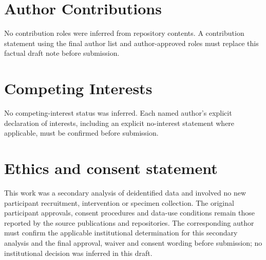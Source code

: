\section*{Author Contributions}

No contribution roles were inferred from repository contents. A contribution statement
using the final author list and author-approved roles must replace this factual draft note
before submission.

\section*{Competing Interests}

No competing-interest status was inferred. Each named author's explicit declaration of
interests, including an explicit no-interest statement where applicable, must be confirmed
before submission.

\section*{Ethics and consent statement}

This work was a secondary analysis of deidentified data and involved no new participant
recruitment, intervention or specimen collection. The original participant approvals,
consent procedures and data-use conditions remain those reported by the source publications
and repositories. The corresponding author must confirm the applicable institutional
determination for this secondary analysis and the final approval, waiver and consent wording
before submission; no institutional decision was inferred in this draft.
